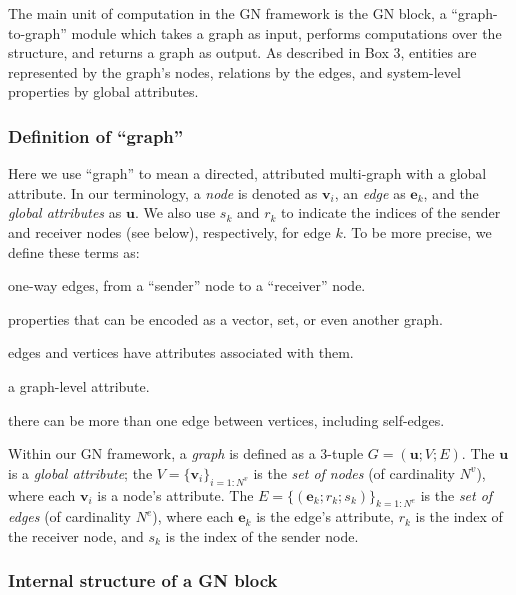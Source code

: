 \documentclass[10pt, onecolumn]{article}
\newcommand{\uv}{\mathbf{u}}    %
\newcommand{\ev}{\mathbf{e}}    %
\newcommand{\vv}{\mathbf{v}}    %
\let\defaultmarginpar\marginpar
\renewcommand\marginpar[2][]{\defaultmarginpar{\itshape\color{gray}#2}}
\begin{document}
The main unit of computation in the GN framework is the GN block, a ``graph-to-graph'' module which takes a graph as input, performs computations over the structure, and returns a graph as output. As described in Box 3, entities are represented by the graph's nodes, relations by the edges, and system-level properties by global attributes.

\subsubsection{Definition of ``graph''}

Here we use ``graph'' to mean a directed, attributed multi-graph with a global attribute. In our terminology, a \emph{node}\marginpar{node, edge, global attribute} is denoted as $\vv_i$, an \emph{edge} as $\ev_k$, and the \emph{global attributes} as $\uv$. We also use $s_k$ and $r_k$ to indicate the indices of the sender and receiver nodes (see below), respectively, for edge $k$.
To be more precise, we define these terms as:
\begin{description}[noitemsep, leftmargin=!,labelwidth=\widthof{\bfseries Global attribute}]
    \item[Directed:] one-way edges, from a ``sender'' node to a ``receiver'' node.
    \item[Attribute:] properties that can be encoded as a vector, set, or even another graph.
    \item[Attributed:] edges and vertices have attributes associated with them.
    \item[Global attribute:] a graph-level attribute.
    \item[Multi-graph:] there can be more than one edge between vertices, including self-edges.
\end{description}

Within our GN framework, a \emph{graph}\marginpar{graph} is defined as a 3-tuple $G = (\uv; V; E)$. The $\uv$ is a \emph{global attribute}; the $V = \{\vv_i \}_{i=1:N^v}$ is the \emph{set of nodes} (of cardinality $N^v$), where each $\mathbf v_i$ is a node's attribute. The $E = \{(\ev_k; r_k; s_k)\}_{k=1:N^e}$ is the \emph{set of edges} (of cardinality $N^e$), where each $\ev_k$ is the edge's attribute, $r_k$ is the index of the receiver node, and $s_k$ is the index of the sender node.

\subsubsection{Internal structure of a GN block}
\end{document}
